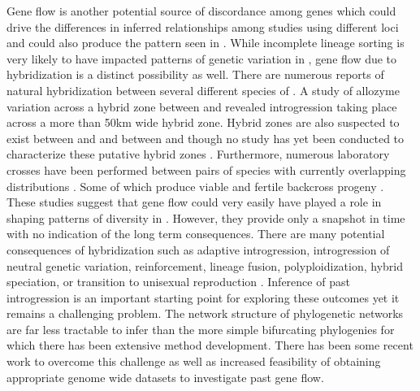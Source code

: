 Gene flow is another potential source of discordance among genes which could  
drive the differences in inferred relationships among studies using different 
loci and could also produce the pattern seen in \fowl \parencite{degnan2009}. 
While incomplete lineage sorting is very likely to have impacted patterns of genetic  
variation in \anaxyrus, gene flow due to hybridization is a distinct possibility as well.
There are numerous reports of natural hybridization between several different 
species of \anaxyrus \parencite{green1996}. 
A study of allozyme variation across a hybrid zone between \amer and 
\hemiophrys revealed introgression taking place across a more than 50km wide hybrid zone.
Hybrid zones are also suspected to exist between \amer and \terr
and between \wood and \fowl though no study has yet been conducted to characterize
these putative hybrid zones \parencite{green1996,weatherby1982}.
Furthermore, numerous laboratory crosses have been performed between pairs of \anaxyrus 
species with currently overlapping distributions \parencite{blair1972,blair1963}.
Some of which produce viable and fertile backcross progeny \parencite{blair1972,blair1963}.
These studies suggest that gene flow could very easily have played a role in shaping patterns
of diversity in \anaxyrus. 
However, they provide only a snapshot in time with no indication of the long term 
consequences.
There are many potential consequences of hybridization such as adaptive introgression, 
introgression of neutral genetic variation, reinforcement, lineage fusion, 
polyploidization, hybrid speciation, or transition to unisexual reproduction \parencite{abbott2013}. 
Inference of past introgression is an important starting point for exploring these
outcomes yet it remains a challenging problem. 
The network structure of phylogenetic networks are far less tractable to infer than the 
more simple bifurcating phylogenies for which there has been extensive method development.
There has been some recent work to overcome this challenge as well as increased 
feasibility of obtaining appropriate genome wide datasets to investigate past 
gene flow.



